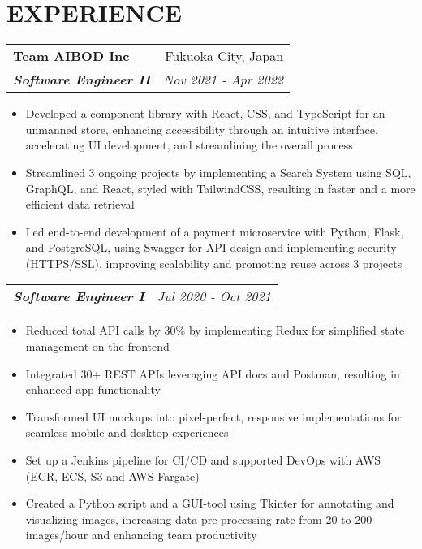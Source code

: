 \documentclass[letterpaper]{article}
\makeatletter
\newcommand{\resumeItemWithoutTitle}[1]{
  \item{
    {#1 \vspace{-4pt}}
  }
}
\newcommand{\resumeSubheadingWithoutTitle}[2]{
  \begin{tabular*}{\textwidth}{l@{\extracolsep{\fill}}r}
        \textbf{\textit{#1}} & \textit{ #2} \\
    \end{tabular*}\vspace{-15pt}
}
\newcommand{\resumeSubheading}[4]{
    \begin{tabular*}{\textwidth}{l@{\extracolsep{\fill}}r}
        \textbf{#1} & #2 \\
        \textbf{\textit{#3}} & \textit{ #4} \\
    \end{tabular*}\vspace{-10pt}
}
\newcommand{\shortSection}[1]{
    \vspace{-6pt}
    \section{#1}
}
\newcommand{\resumeItemListStart}{\begin{itemize}}
\newcommand{\resumeItemListEnd}{\end{itemize}}
\makeatother
\begin{document}
\shortSection{EXPERIENCE}
\resumeSubheading
{Team AIBOD Inc}{Fukuoka City, Japan}
{Software Engineer II}{Nov 2021 - Apr 2022}
\vspace{2pt}
\resumeItemListStart
\resumeItemWithoutTitle{Developed a component library with React, CSS, and TypeScript for an unmanned store, enhancing accessibility through an intuitive interface, accelerating UI development, and streamlining the overall process}
\resumeItemWithoutTitle{Streamlined 3 ongoing projects by implementing a Search System using SQL, GraphQL, and React, styled with TailwindCSS, resulting in faster and a more efficient data retrieval}
\resumeItemWithoutTitle{Led end-to-end development of a payment microservice with Python, Flask, and PostgreSQL, using Swagger for API design and implementing security (HTTPS/SSL), improving scalability and promoting reuse across 3 projects}
\resumeItemListEnd

\vspace{2pt}
\resumeSubheadingWithoutTitle
{Software Engineer I}{Jul 2020 - Oct 2021}
\vspace{0pt}
\resumeItemListStart
\resumeItemWithoutTitle{Reduced total API calls by 30\% by implementing Redux for simplified state management on the frontend}
\resumeItemWithoutTitle{Integrated 30+ REST APIs leveraging API docs and Postman, resulting in enhanced app functionality}
\resumeItemWithoutTitle{Transformed UI mockups into pixel-perfect, responsive implementations for seamless mobile and desktop experiences}
\resumeItemWithoutTitle{Set up a Jenkins pipeline for CI/CD and supported DevOps with AWS (ECR, ECS, S3 and AWS Fargate)}
\resumeItemWithoutTitle{Created a Python script and a GUI-tool using Tkinter for annotating and visualizing images, increasing data pre-processing rate from 20 to 200 images/hour and enhancing team productivity}
\resumeItemListEnd
\end{document}
